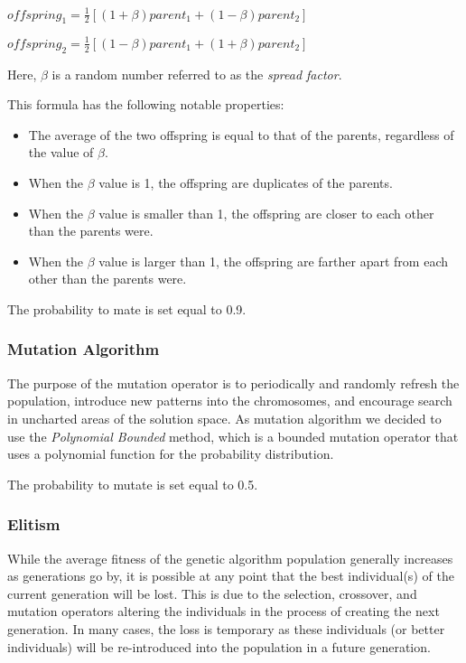 $
	offspring_1 = \frac{1}{2}[(1+\beta)parent_1 + (1-\beta)parent_2] 
$
\medskip

$
	offspring_2 = \frac{1}{2}[(1-\beta)parent_1 + (1+\beta)parent_2]
$


\noindent Here, $\beta$ is a random number referred to as the \textit{spread factor}.

\noindent This formula has the following notable properties:
\begin{itemize}
\item The average of the two offspring is equal to that of the parents, regardless of the value of $\beta$.
\item When the $\beta$ value is 1, the offspring are duplicates of the parents.
\item When the $\beta$ value is smaller than 1, the offspring are closer to each other than the parents were.
\item When the $\beta$ value is larger than 1, the offspring are farther apart from each other than the parents were.
\end{itemize}

\noindent The probability to mate is set equal to 0.9.

\subsubsection{Mutation Algorithm}
The purpose of the mutation operator is to periodically and randomly refresh the population, introduce new patterns into the chromosomes, and encourage search in uncharted areas of the solution space.
As mutation algorithm we decided to use the \textit{Polynomial Bounded} method, which is a bounded mutation operator that uses a polynomial function for the probability distribution.

\noindent The probability to mutate is set equal to 0.5.

\subsubsection{Elitism}
While the average fitness of the genetic algorithm population generally increases as generations go by, it is possible at any point that the best individual(s) of the current generation will be lost. This is due to the selection, crossover, and mutation operators altering the individuals in the process of creating the next generation. In many cases, the loss is temporary as these individuals (or better individuals) will be re-introduced into the population in a future generation.

